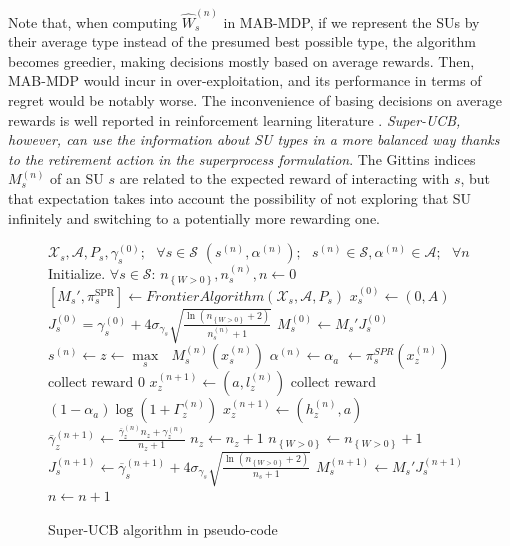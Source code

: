 Note that, when computing $\widehat{W}_s^{(n)}$ in MAB-MDP, if we represent the SUs by their average type instead of the presumed best possible type, the algorithm becomes greedier, making decisions mostly based on average rewards. Then, MAB-MDP would incur in over-exploitation, and its performance in terms of regret would be notably worse. The inconvenience of basing decisions on average rewards is well reported in reinforcement learning literature \cite{ref:Sutton1998}. \textit{Super-UCB, however, can use the information about SU types in a more balanced way thanks to the retirement action in the superprocess formulation}. The Gittins indices $M_s^{(n)}$ of an SU $s$ are related to the expected reward of interacting with $s$, but that expectation takes into account the possibility of not exploring that SU infinitely and switching to a potentially more rewarding one. 

\begin{figure}
\begin{algorithmic}[1]
  \REQUIRE $\mathcal{X}_s,\mathcal{A},P_s,\gamma_s^{(0)};\text{ } \forall s \in \mathcal{S}$
  \ENSURE $(s^{(n)},\alpha^{(n)});\text{ } s^{(n)} \in \mathcal{S}, \alpha^{(n)} \in \mathcal{A};\text{ } \forall n$
  \STATE Initialize. $\forall s \in \mathcal{S}$: 
    \STATE\hspace{\algorithmicindent}$n_{\left\{W>0\right\}}, n_s^{(n)}, n \leftarrow 0$
    \STATE\hspace{\algorithmicindent}$[{M_s'},\pi_s^{\text{SPR}}] \leftarrow Frontier Algorithm(\mathcal{X}_s,\mathcal{A},P_s)$   
    \STATE\hspace{\algorithmicindent}$x_s^{(0)} \leftarrow (0,A)$
    \STATE\hspace{\algorithmicindent}$J_s^{(0)} = \gamma_{s}^{(0)}+4\sigma_{\gamma_s}\sqrt{\frac{\ln{(n_{\left\{W>0\right\}}+2)}}{n_s^{(n)}+1}}$    
    \STATE\hspace{\algorithmicindent}$M_s^{(0)} \leftarrow M_s'J_s^{(0)}$
  \LOOP
    \STATE $s^{(n)} \leftarrow z \leftarrow \underset{s}\max{\text{ }}M_s^{(n)}(x_s^{(n)})$
    \STATE $\alpha^{(n)} \leftarrow \alpha_a$ $\leftarrow \pi_s^{SPR}(x_z^{(n)})$
      \STATE collect reward  $0$
      \STATE $x_z^{(n+1)} \leftarrow (a,l_z^{(n)})$
    \ELSE
      \STATE collect reward $(1-\alpha_a)\log(1+\Gamma_{z}^{(n)})$
      \STATE $x_{z}^{(n+1)} \leftarrow (h_z^{(n)},a)$ 
      \STATE $\overline{\gamma}_{z}^{(n+1)} \leftarrow \frac{\overline{\gamma}_{z}^{(n)}n_z+\gamma_z^{(n)}}{n_z+1}$  
      \STATE $n_{z} \leftarrow n_{z} + 1$
      \STATE $n_{\left\{W>0\right\}} \leftarrow n_{\left\{W>0\right\}} + 1$
        \STATE $J_s^{(n+1)} \leftarrow \overline{\gamma}_{s}^{(n+1)} + 4\sigma_{\gamma_s} \sqrt{\frac{\ln{(n_{\left\{W>0\right\}}+2)}}{n_s+1}}$
        \STATE $M_s^{(n+1)} \leftarrow M_s'J_s^{(n+1)}$
      \ENDFOR
    \ENDIF
    \STATE $n \leftarrow n+1$
  \ENDLOOP
\end{algorithmic}
\caption{Super-UCB algorithm in pseudo-code}
\label{code:FA_UCB}
\end{figure}

